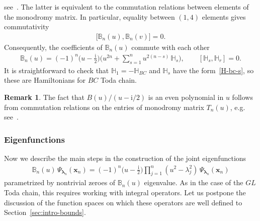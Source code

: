 \documentclass[11pt]{article}
\numberwithin{equation}{section}
\theoremstyle{plain}
\theoremstyle{definition}
\newtheorem{remark}{Remark}
\newcommand{\B}{\mathbb{B}}
\renewcommand{\imath}{\mathrm{i}}
\begin{document}
see~\cite[Proposition 2]{Skl}. The latter is equivalent to the commutation relations between elements of the monodromy matrix. In particular, equality between $(1,4)$ elements gives commutativity
\begin{align}
	\bigl[ \B_n(u), \B_n(v) \bigr] = 0.
\end{align}
Consequently, the coefficients of $\B_n(u)$ commute with each other
\begin{align}
	\B_n(u) = (-1)^n \biggl(u - \frac{\imath}{2} \biggr) \biggl( u^{2n} + \sum_{s = 1}^n u^{2(n - s)} \, \mathbb{H}_s \biggr), \qquad [\mathbb{H}_s, \mathbb{H}_r] = 0.
\end{align}
It is straightforward to check that $\mathbb{H}_1 = -\mathbb{H}_{BC}$ and $\mathbb{H}_s$ have the form~\eqref{H-bc-s}, so these are Hamiltonians for $BC$ Toda chain.

\begin{remark}
	The fact that $B(u)/(u - \imath/2)$ is an even polynomial in $u$ follows from commutation relations on the entries of monodromy matrix $T_n(u)$, e.g. see~\cite[p. 14--15]{ADV2}.
\end{remark}

\subsubsection{Eigenfunctions} \label{sec:intro-eigen}

Now we describe the main steps in the construction of the joint eigenfunctions
\begin{align}\label{B-eigen}
	\B_n(u) \, \Psi_{\bm{\lambda}_n}(\bm{x}_n) = (-1)^n \biggl(u - \frac{\imath}{2} \biggr) \prod_{j = 1}^n (u^2 - \lambda_j^2) \, \Psi_{\bm{\lambda}_n}(\bm{x}_n)
\end{align}
parametrized by nontrivial zeroes of $\B_n(u)$ eigenvalue. As in the case of the $GL$ Toda chain, this requires working with integral operators. Let us postpone the discussion of the function spaces on which these operators are well defined to Section~\ref{sec:intro-bounds}.
\end{document}
